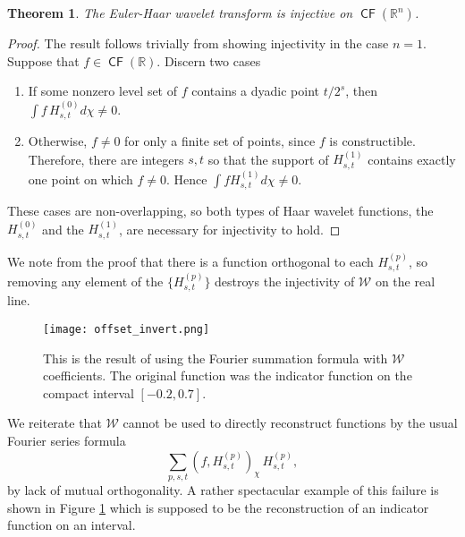 \documentclass{psapm-l}
\newtheorem{theorem}{Theorem}[section]
\theoremstyle{definition}
\theoremstyle{remark}
\numberwithin{equation}{section}
\begin{document}
\begin{theorem}
\label{thm:EHWTinjectivity}
The Euler-Haar wavelet transform is injective on ${{{\operatorname{\mathsf{{CF}}}}}}({{\mathbb R}}^n)$.
\end{theorem}
\begin{proof}
The result follows trivially from showing injectivity in the case $n=1$. Suppose that $f\in {{{\operatorname{\mathsf{{CF}}}}}}({{\mathbb R}})$.  Discern two cases
\begin{enumerate}
\item If some nonzero level set of $f$ contains a dyadic point $t/2^s$, then $\int f\,H^{(0)}_{s,t} d\chi \not= 0$.
\item Otherwise, $f\not= 0$ for only a finite set of points, since $f$ is constructible.  Therefore, there are integers $s,t$ so that the support of $H^{(1)}_{s,t}$ contains exactly one point on which $f\not= 0$.  Hence $\int f H^{(1)}_{s,t} d\chi \not= 0$.
\end{enumerate}
These cases are non-overlapping, so both types of Haar wavelet functions, the $H^(0)_{s,t}$ and the $H^(1)_{s,t}$, are necessary for injectivity to hold.
\end{proof}

We note from the proof that there is a function orthogonal to each $H^{(p)}_{s,t}$, so removing any element of the $\{H^{(p)}_{s,t}\}$ destroys the injectivity of ${{\mathcal W}}$ on the real line.

\begin{figure}[h]
  \begin{center}
       \texttt{[image: offset\_invert.png]}
  \end{center}
  \caption{This is the result of using the Fourier summation formula with ${{\mathcal W}}$ coefficients. The original function was the indicator function on the compact interval $[-0.2,0.7]$.}
  \label{fig:invertfail}
\end{figure}

We reiterate that ${{\mathcal W}}$ cannot be used to directly reconstruct functions by the usual Fourier series formula
\begin{equation*}
    \sum_{p,s,t} (f,H^{(p)}_{s,t})_\chi\, H^{(p)}_{s,t},
\end{equation*}
by lack of mutual orthogonality.  A rather spectacular example of this failure is shown in Figure \ref{fig:invertfail} which is supposed to be the reconstruction of an indicator function on an interval.
\end{document}
